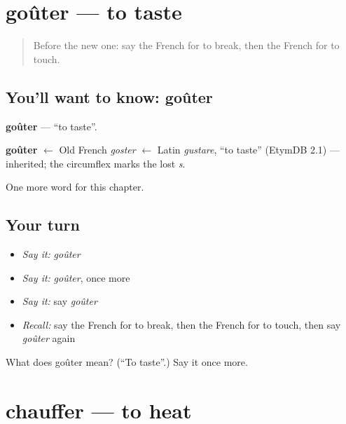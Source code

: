 \section[goûter]{goûter — to taste}

\label{lesson:FR-C206-gouter}



\begin{quote}
Before the new one: say the French for to break, then the French for to touch.
\end{quote}

\subsection*{You'll want to know: goûter}
\textbf{goûter} — \textquotedblleft{}to taste\textquotedblright{}.

\begin{cousinweb}
\textbf{goûter} $\leftarrow$ Old French \emph{goster} $\leftarrow$ Latin \emph{gustare}, \textquotedblleft{}to taste\textquotedblright{} (EtymDB 2.1) — inherited; the circumflex marks the lost \emph{s}.
\end{cousinweb}

\begin{grammarlens}[title={What you've built}]
One more word for this chapter.
\end{grammarlens}

\subsection*{Your turn}
\begin{itemize}
\raggedright
  \item \emph{Say it:} \emph{goûter}
  \item \emph{Say it:} \emph{goûter}, once more
  \item \emph{Say it:} say \emph{goûter}
  \item \emph{Recall:} say the French for to break, then the French for to touch, then say \emph{goûter} again
\end{itemize}

\begin{tcolorbox}[breakable,colback=teal!4,colframe=teal!35!black,title={Before you move on}]
What does goûter mean? (\textquotedblleft{}To taste\textquotedblright{}.) Say it once more.
\end{tcolorbox}
\section[chauffer]{chauffer — to heat}

